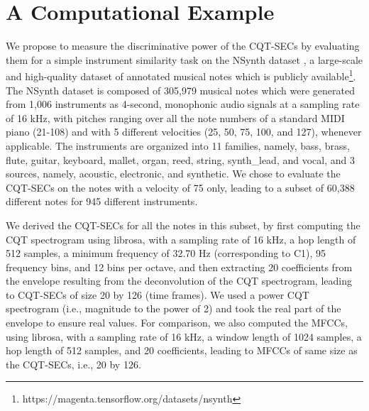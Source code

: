 \documentclass[journal]{IEEEtran}
\begin{document}
\section{A Computational Example}

We propose to measure the discriminative power of the CQT-SECs by evaluating them for a simple instrument similarity task on the NSynth dataset \cite{engel2017}, a large-scale and high-quality dataset of annotated musical notes which is publicly available\footnote{https://magenta.tensorflow.org/datasets/nsynth}. The NSynth dataset is composed of 305,979 musical notes which were generated from 1,006 instruments as 4-second, monophonic audio signals at a sampling rate of 16 kHz, with pitches ranging over all the note numbers of a standard MIDI piano (21-108) and with 5 different velocities (25, 50, 75, 100, and 127), whenever applicable. The instruments are organized into 11 families, namely, bass, brass, flute, guitar, keyboard, mallet, organ, reed, string, synth\_lead, and vocal, and 3 sources, namely, acoustic, electronic, and synthetic. We chose to evaluate the CQT-SECs on the notes with a velocity of 75 only, leading to a subset of 60,388 different notes for 945 different instruments.

We derived the CQT-SECs for all the notes in this subset, by first computing the CQT spectrogram using librosa, with a sampling rate of 16 kHz, a hop length of 512 samples, a minimum frequency of 32.70 Hz (corresponding to C1), 95 frequency bins, and 12 bins per octave, and then extracting 20 coefficients from the envelope resulting from the deconvolution of the CQT spectrogram, leading to CQT-SECs of size 20 by 126 (time frames). We used a power CQT spectrogram (i.e., magnitude to the power of 2) and took the real part of the envelope to ensure real values. For comparison, we also computed the MFCCs, using librosa, with a sampling rate of 16 kHz, a window length of 1024 samples, a hop length of 512 samples, and 20 coefficients, leading to MFCCs of same size as the CQT-SECs, i.e., 20 by 126.
\end{document}
